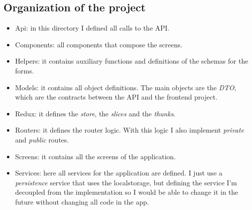     \subsection{Organization of the project}
        \begin{itemize}[noitemsep]
            \item Api: in this directory I defined all calls to the API.
            \item Components: all components that compose the screens.
            \item Helpers: it contains auxiliary functions and definitions of the schemas for the forms.
            \item Models: it contains all object definitions. The main objects are the \textit{DTO}, which are the contracts between the API and the frontend project.
            \item Redux: it defines the \textit{store}, the \textit{slices} and the \textit{thunks}. 
            \item Routers: it defines the router logic. With this logic I also implement \textit{private} and \textit{public} routes.
            \item Screens: it contains all the screens of the application.
            \item Services: here all services for the application are defined. I just use a \textit{persistence} service that uses the localstorage, but defining the service I'm decoupled from the implementation so I would be able to change it in the future without changing all code in the app.
        \end{itemize}


